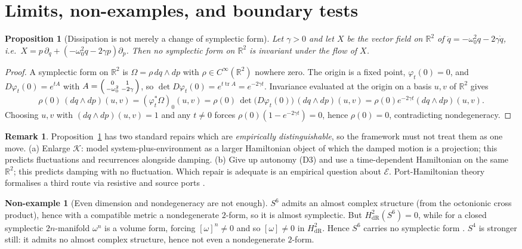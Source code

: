 \documentclass[10pt,a4paper]{article}
\theoremstyle{plain}
\newtheorem{proposition}[theorem]{Proposition}
\theoremstyle{definition}
\newtheorem{nonexample}[theorem]{Non-example}
\newtheorem{remark}[theorem]{Remark}
\newcommand{\Cinf}{C^{\infty}}
\newcommand{\dR}{\mathrm{dR}}
\newcommand{\R}{\mathbb{R}}
\DeclareMathOperator{\tr}{tr}
\begin{document}
\section{Limits, non-examples, and boundary tests}
\label{sec:limits}

\begin{proposition}[Dissipation is not merely a change of symplectic form]
\label{prop:damped}
Let $\gamma>0$ and let $X$ be the vector field on $\R^2$ of $\ddot q = -\omega_0^2q - 2\gamma\dot q$, i.e.\ $X = p\,\partial_q + (-\omega_0^2q - 2\gamma p)\partial_p$. Then no symplectic form on $\R^2$ is invariant under the flow of $X$.
\end{proposition}
\begin{proof}
A symplectic form on $\R^2$ is $\Omega = \rho\,dq\wedge dp$ with $\rho \in \Cinf(\R^2)$ nowhere zero. The origin is a fixed point, $\varphi_t(0) = 0$, and $D\varphi_t(0) = e^{tA}$ with $A = \begin{psmallmatrix}0&1\\ -\omega_0^2 & -2\gamma\end{psmallmatrix}$, so $\det D\varphi_t(0) = e^{t\tr A} = e^{-2\gamma t}$. Invariance evaluated at the origin on a basis $u,v$ of $\R^2$ gives
\[
\rho(0)\,(dq\wedge dp)(u,v) = (\varphi_t^*\Omega)_0(u,v) = \rho(0)\,\det\!\big(D\varphi_t(0)\big)\,(dq\wedge dp)(u,v) = \rho(0)e^{-2\gamma t}(dq\wedge dp)(u,v).
\]
Choosing $u,v$ with $(dq\wedge dp)(u,v) = 1$ and any $t\neq0$ forces $\rho(0)(1 - e^{-2\gamma t}) = 0$, hence $\rho(0) = 0$, contradicting nondegeneracy.
\end{proof}

\begin{remark}
\label{rem:repairs}
Proposition~\ref{prop:damped} has two standard repairs which are \emph{empirically distinguishable}, so the framework must not treat them as one move. (a) Enlarge $\mathcal{K}$: model system-plus-environment as a larger Hamiltonian object of which the damped motion is a projection; this predicts fluctuations and recurrences alongside damping. (b) Give up autonomy (D3) and use a time-dependent Hamiltonian on the same $\R^2$; this predicts damping with no fluctuation. Which repair is adequate is an empirical question about $\mathcal{E}$. Port-Hamiltonian theory formalises a third route via resistive and source ports \cite{vanderSchaftJeltsema2014}.
\end{remark}

\begin{nonexample}[Even dimension and nondegeneracy are not enough]
\label{nonex:s6}
$S^6$ admits an almost complex structure (from the octonionic cross product), hence with a compatible metric a nondegenerate $2$-form, so it is almost symplectic. But $H^2_{\dR}(S^6) = 0$, while for a closed symplectic $2n$-manifold $\omega^n$ is a volume form, forcing $[\omega]^n\neq0$ and so $[\omega]\neq0$ in $H^2_{\dR}$. Hence $S^6$ carries no symplectic form \cite[Ch.~4]{McDuffSalamon2017}. $S^4$ is stronger still: it admits no almost complex structure, hence not even a nondegenerate $2$-form.
\end{nonexample}
\end{document}
